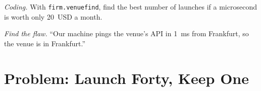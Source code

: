 \begin{exercise}[$\star\star\star$]\label{exo:nw:where-the-crypto-venues-live:7}
\emph{Coding.} With \texttt{firm.venuefind}, find the best number of launches if a microsecond is worth only 20~USD a month.
\end{exercise}

\begin{exercise}[$\star\star\star$]\label{exo:nw:where-the-crypto-venues-live:8}
\emph{Find the flaw.} ``Our machine pings the venue's API in \qty{1}{\milli\second} from Frankfurt, so the venue is in Frankfurt.''
\end{exercise}

\section{Problem: Launch Forty, Keep One}


